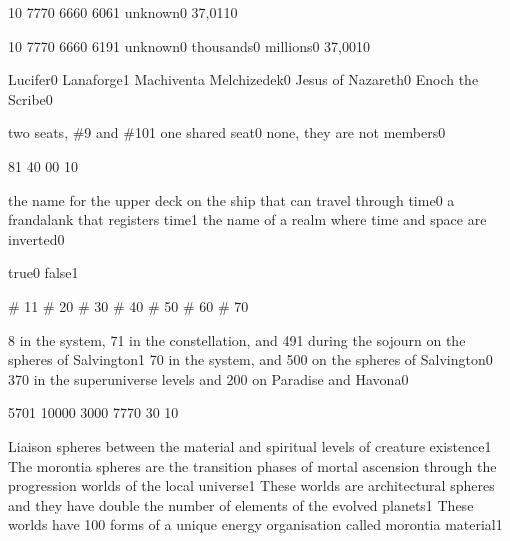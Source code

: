 {1}{0}
{777}{0}
{666}{0}
{606}{1}
{unknown}{0}
{37,011}{0}
\qstop

{1}{0}
{777}{0}
{666}{0}
{619}{1}
{unknown}{0}
{thousands}{0}
{millions}{0}
{37,001}{0}
\qstop

{Lucifer}{0}
{Lanaforge}{1}
{Machiventa Melchizedek}{0}
{Jesus of Nazareth}{0}
{Enoch the Scribe}{0}
\qstop

{two seats, \#9 and \#10}{1}
{one shared seat}{0}
{none, they are not members}{0}
\qstop

{8}{1}
{4}{0}
{0}{0}
{1}{0}
\qstop


{the name for the upper deck on the ship that can travel through time}{0}
{a frandalank that registers time}{1}
{the name of a realm where time and space are inverted}{0}
\qstop

{true}{0}
{false}{1}
\qstop


{\# 1}{1}
{\# 2}{0}
{\# 3}{0}
{\# 4}{0}
{\# 5}{0}
{\# 6}{0}
{\# 7}{0}
\qstop


{8 in the system, 71 in the constellation, and 491 during the sojourn on the spheres of Salvington}{1}
{70 in the system, and 500 on the spheres of Salvington}{0}
{370 in the superuniverse levels and 200 on Paradise and Havona}{0}
\qstop

{570}{1}
{1000}{0}
{300}{0}
{777}{0}
{3}{0}
{1}{0}
\qstop

{Liaison spheres between the material and spiritual levels of creature existence}{1}
{The morontia spheres are the transition phases of mortal ascension through the progression worlds of the local universe}{1}
{These worlds are architectural spheres and they have double the number of elements of the evolved planets}{1}
{These worlds have 100 forms of a unique energy organisation called morontia material}{1}
\qstop


